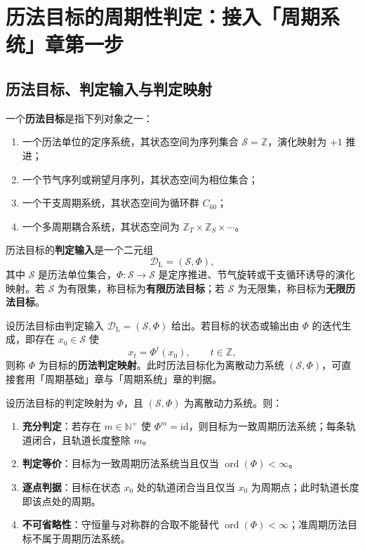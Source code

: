 \section{历法目标的周期性判定：接入「周期系统」章第一步}
\label{sec:calendar_periodicity_decision}

\subsection{历法目标、判定输入与判定映射}

\begin{definition}[历法目标与判定输入]\label{def:calendar_target}
一个\textbf{历法目标}是指下列对象之一：
\begin{enumerate}[label=(\roman*)]
    \item 一个历法单位的定序系统，其状态空间为序列集合 \(\mathcal S=\mathbb Z\)，演化映射为 \(+1\) 推进；
    \item 一个节气序列或朔望月序列，其状态空间为相位集合；
    \item 一个干支周期系统，其状态空间为循环群 \(C_{60}\)；
    \item 一个多周期耦合系统，其状态空间为 \(\mathbb Z_T\times\mathbb Z_S\times\cdots\)。
\end{enumerate}
历法目标的\textbf{判定输入}是一个二元组
\[
\mathcal D_{\mathrm{L}}=(\mathcal S,\Phi),
\]
其中 \(\mathcal S\) 是历法单位集合，\(\Phi:\mathcal S\to\mathcal S\) 是定序推进、节气旋转或干支循环诱导的演化映射。若 \(\mathcal S\) 为有限集，称目标为\textbf{有限历法目标}；若 \(\mathcal S\) 为无限集，称目标为\textbf{无限历法目标}。
\end{definition}

\begin{definition}[历法判定映射]\label{def:calendar_periodization}
设历法目标由判定输入 \(\mathcal D_{\mathrm{L}}=(\mathcal S,\Phi)\) 给出。若目标的状态或输出由 \(\Phi\) 的迭代生成，即存在 \(x_0\in\mathcal S\) 使
\[
x_t=\Phi^t(x_0),\qquad t\in\mathbb Z,
\]
则称 \(\Phi\) 为目标的\textbf{历法判定映射}。此时历法目标化为离散动力系统 \((\mathcal S,\Phi)\)，可直接套用「周期基础」章与「周期系统」章的判据。
\end{definition}

\begin{theorem}[历法周期性判定定理]\label{thm:calendar_periodicity_decision}
设历法目标的判定映射为 \(\Phi\)，且 \((\mathcal S,\Phi)\) 为离散动力系统。则：
\begin{enumerate}[label=(\Alph*)]
    \item \textbf{充分判定}：若存在 \(m\in\mathbb N^+\) 使 \(\Phi^m=\mathrm{id}\)，则目标为一致周期历法系统；每条轨道闭合，且轨道长度整除 \(m\)。
    \item \textbf{判定等价}：目标为一致周期历法系统当且仅当 \(\operatorname{ord}(\Phi)<\infty\)。
    \item \textbf{逐点判据}：目标在状态 \(x_0\) 处的轨道闭合当且仅当 \(x_0\) 为周期点；此时轨道长度即该点处的周期。
    \item \textbf{不可省略性}：守恒量与对称群的合取不能替代 \(\operatorname{ord}(\Phi)<\infty\)；准周期历法目标不属于周期历法系统。
\end{enumerate}
\end{theorem}

